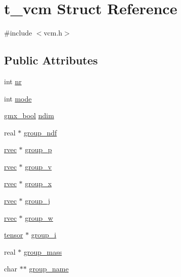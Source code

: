 \hypertarget{structt__vcm}{\section{t\-\_\-vcm \-Struct \-Reference}
\label{structt__vcm}
}


{\ttfamily \#include $<$vcm.\-h$>$}

\subsection*{\-Public \-Attributes}
\begin{DoxyCompactItemize}
\item 
int \hyperlink{structt__vcm_a50e39889aad6dcc4070f87f02bc3e2ec}{nr}
\item 
int \hyperlink{structt__vcm_aa07f7c4ac7d7f11b7d285396c7f96410}{mode}
\item 
\hyperlink{include_2types_2simple_8h_a8fddad319f226e856400d190198d5151}{gmx\-\_\-bool} \hyperlink{structt__vcm_a0f567dd51a7e2a9e1c4d1fb2908946d1}{ndim}
\item 
real $\ast$ \hyperlink{structt__vcm_af3abbea38b643bdeebd2ace7116e7fae}{group\-\_\-ndf}
\item 
\hyperlink{share_2template_2gromacs_2types_2simple_8h_aa02a552a4abd2f180c282a083dc3a999}{rvec} $\ast$ \hyperlink{structt__vcm_a96046b42878fe52d68b44f9bbe18407c}{group\-\_\-p}
\item 
\hyperlink{share_2template_2gromacs_2types_2simple_8h_aa02a552a4abd2f180c282a083dc3a999}{rvec} $\ast$ \hyperlink{structt__vcm_a36ffd94ab8d358152e419e8ea29ca64c}{group\-\_\-v}
\item 
\hyperlink{share_2template_2gromacs_2types_2simple_8h_aa02a552a4abd2f180c282a083dc3a999}{rvec} $\ast$ \hyperlink{structt__vcm_a33499f96d982b1ca8cedbc57e0cb05c3}{group\-\_\-x}
\item 
\hyperlink{share_2template_2gromacs_2types_2simple_8h_aa02a552a4abd2f180c282a083dc3a999}{rvec} $\ast$ \hyperlink{structt__vcm_a4e94951ccebd74d5bca32f2440e8736d}{group\-\_\-j}
\item 
\hyperlink{share_2template_2gromacs_2types_2simple_8h_aa02a552a4abd2f180c282a083dc3a999}{rvec} $\ast$ \hyperlink{structt__vcm_aed78b162693f9b793741525568b0e156}{group\-\_\-w}
\item 
\hyperlink{share_2template_2gromacs_2types_2simple_8h_aef0bf341f56ce75f09dbb64350488a61}{tensor} $\ast$ \hyperlink{structt__vcm_ae89343f524e14c31a2dacf3b39acd746}{group\-\_\-i}
\item 
real $\ast$ \hyperlink{structt__vcm_a5c011b467bc3b682ff811bcbd306e7eb}{group\-\_\-mass}
\item 
char $\ast$$\ast$ \hyperlink{structt__vcm_adc98417493592c68b923d20df972c384}{group\-\_\-name}
\end{DoxyCompactItemize}


